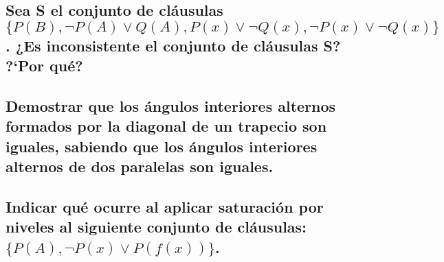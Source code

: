 \documentclass[10pt, a4paper,spanish]{article}
\begin{document}
			\paragraph{}


		\subsection{Sea S el conjunto de cláusulas $ \{ P(B), \lnot P(A) \lor Q(A), P(x) \lor \lnot Q(x), \lnot P(x) \lor \lnot Q(x) \} $. ¿Es inconsistente el conjunto de cláusulas S? ?`Por qué?}

			\paragraph{}


		\subsection{Demostrar que los ángulos interiores alternos formados por la diagonal de un trapecio son iguales, sabiendo que los ángulos interiores alternos de dos paralelas son iguales.}

			\paragraph{}


		\subsection{Indicar qué ocurre al aplicar saturación por niveles al siguiente conjunto de cláusulas: $ \{ P(A), \lnot P(x) \lor P(f(x)) \} $.}

			\paragraph{}
\end{document}
